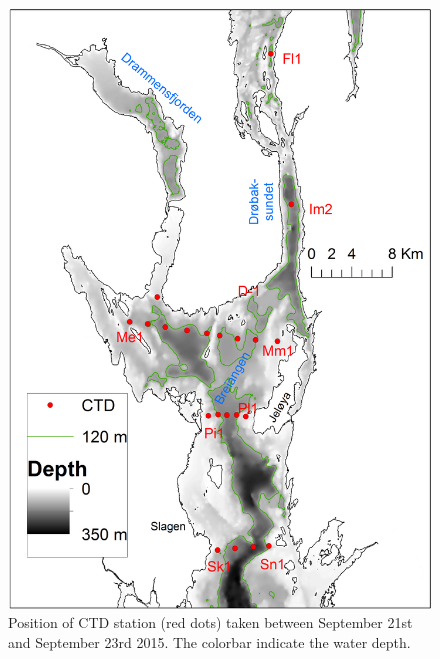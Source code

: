 \documentclass[12pt,a4paper,english]{article}
\begin{document}
\begin{figure}[ht]
\centerline{
\includegraphics*[width=\textwidth]{Figurer/Kart_Breiangen.png}}
\caption{\small
Position of CTD station (red dots) taken between September 21st and September 23rd 2015.
The colorbar indicate the water depth.}
\label{fig:CTD_Kart}
\end{figure}
\end{document}
